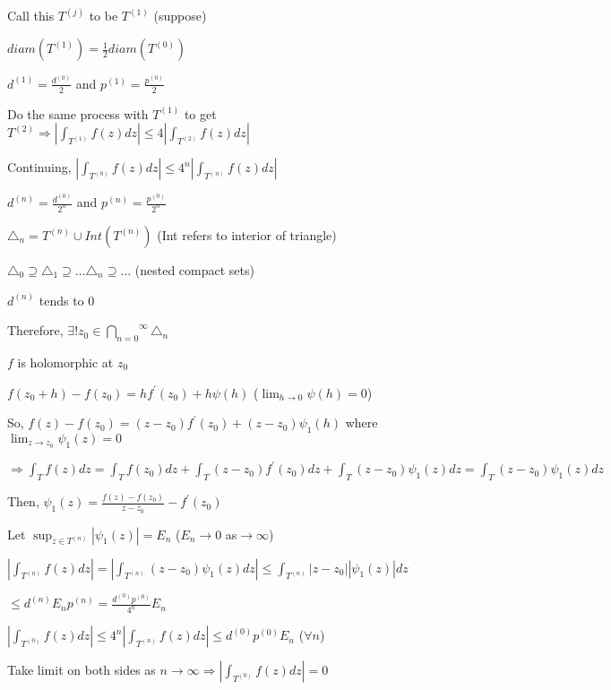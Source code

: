 \documentclass{article}
\begin{document}
\begin{flushleft}
Call this $T^{(j)}$ to be $T^{(1)}$ (suppose)

$diam(T^{(1)})=\frac{1}{2}diam(T^{(0)})$ 

$d^{(1)}=\frac{d^{(0)}}{2}$ and $p^{(1)}=\frac{p^{(0)}}{2}$

Do the same process with $T^{(1)}$ to get $T^{(2)}\Rightarrow |\int_{T^{(1)}}^{} f(z) dz| \leq 4|\int_{T^{(2)}}^{} f(z) dz|$ 

Continuing, $|\int_{T^{(0)}}^{} f(z) dz| \leq 4^n|\int_{T^{(n)}}^{} f(z) dz|$ 

$d^{(n)}=\frac{d^{(0)}}{2^n}$ and $p^{(n)}=\frac{p^{(0)}}{2^n}$

$\triangle_n= T^{(n)} \cup Int(T^{(n)})$ (Int refers to interior of triangle)

$\triangle_0\supseteq \triangle_1 \supseteq \dots \triangle_n\supseteq \dots$ (nested compact sets)

$d^{(n)}$ tends to $0$

Therefore, $\exists!z_0 \in \overset{\infty}{\underset{n=0}{\bigcap}} \triangle_n$

$f$ is holomorphic at $z_0$

$f(z_0+h)-f(z_0)=hf^{'}(z_0)+h\psi(h)$ ($\lim_{h \to 0}\psi(h)=0$)

So, $f(z)-f(z_0)=(z-z_0)f^{'}(z_0) + (z-z_0)\psi_1(h)$ where $\lim_{z \to z_0}\psi_1(z)=0$

$\Rightarrow \int_{T}^{} f(z) dz= \int_{T}^{} f(z_0) dz + \int_{T}^{} (z-z_0)f^{'}(z_0) dz + \int_{T}^{} (z-z_0)\psi_1(z) dz= \int_{T}^{} (z-z_0)\psi_1(z) dz$

Then, $\psi_1(z)= \frac{f(z)-f(z_0)}{z-z_0}-f^{'}(z_0)$

Let $\sup_{z\in T^{(n)}}|\psi_1(z)|= E_n$ ($E_n\rightarrow 0$ as$\rightarrow \infty$)

$|\int_{T^{(n)}}^{} f(z) dz|=|\int_{T^{(n)}}^{} (z-z_0)\psi_1(z) dz|\leq \int_{T^{(n)}}^{} |z-z_0||\psi_1(z)| dz$

$\leq d^{(n)}E_np^{(n)}=\frac{d^{(0)}p^{(0)}}{4^n}E_n$

$|\int_{T^{(0)}}^{} f(z) dz|\leq 4^n|\int_{T^{(n)}}^{} f(z) dz|\leq d^{(0)}p^{(0)}E_n$ ($\forall n$)

Take limit on both sides as $n\rightarrow \infty\Rightarrow |\int_{T^{(0)}}^{} f(z) dz|=0$ 

\end{flushleft}
\end{document}
